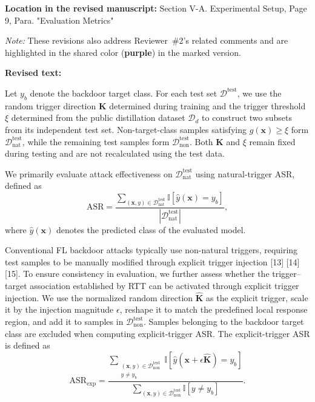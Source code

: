 \documentclass[11pt,a4paper]{article}
\newcommand{\manualindent}{\par\noindent\hspace*{1.5em}\ignorespaces}
\newcommand{\revisedtext}[2]{%
  {\bfseries\color{headingnavy}Location in the revised manuscript:} #1\par
  \begin{tcolorbox}[
      enhanced,breakable,colback=replyblue!3,colframe=replyblue!18,
      before upper={\setlength{\parskip}{6pt}},
      borderline west={2.5pt}{0pt}{replyblue},
      boxrule=0.5pt,arc=1mm,left=11pt,right=9pt,top=8pt,bottom=8pt]
    {\bfseries\color{headingnavy}Revised text:}\par
    #2
  \end{tcolorbox}
  \vspace{0.35em}%
}
\begin{document}
\revisedtext{Section V-A. Experimental Setup, Page 9, Para. "Evaluation Metrics"\par
\noindent \textit{Note:} These revisions also address Reviewer~\#2's related comments and are highlighted in the shared color (\textcolor{share}{\textbf{purple}}) in the marked version.}
{\manualindent Let $y_b$ denote the backdoor target class.
For each test set $\mathcal{D}^{\mathrm{test}}$, we use the random trigger direction $\mathbf{K}$ determined during training and the trigger threshold $\xi$ determined from the public distillation dataset $\mathcal{D}_d$ to construct two subsets from its independent test set.
Non-target-class samples satisfying $g(\mathbf{x}) \geq \xi$ form $\mathcal{D}_{\mathrm{nat}}^{\mathrm{test}}$, while the remaining test samples form $\mathcal{D}_{\mathrm{non}}^{\mathrm{test}}$.
Both $\mathbf{K}$ and $\xi$ remain fixed during testing and are not recalculated using the test data.

We primarily evaluate attack effectiveness on $\mathcal{D}_{\mathrm{nat}}^{\mathrm{test}}$ using natural-trigger ASR, defined as
\begin{equation}
\mathrm{ASR}
=
\frac{
\sum_{(\mathbf{x},y)\in\mathcal{D}_{\mathrm{nat}}^{\mathrm{test}}}
\mathbb{I}[\hat{y}(\mathbf{x})=y_b]
}{
|\mathcal{D}_{\mathrm{nat}}^{\mathrm{test}}|
},
\tag{19}
\end{equation}
where $\hat{y}(\mathbf{x})$ denotes the predicted class of the evaluated model.

\manualindent Conventional FL backdoor attacks typically use non-natural triggers, requiring test samples to be manually modified through explicit trigger injection [13] [14] [15].
To ensure consistency in evaluation, we further assess whether the trigger--target association established by RTT can be activated through explicit trigger injection.
We use the normalized random direction $\hat{\mathbf{K}}$ as the explicit trigger, scale it by the injection magnitude $\epsilon$, reshape it to match the predefined local response region, and add it to samples in $\mathcal{D}_{\mathrm{non}}^{\mathrm{test}}$.
Samples belonging to the backdoor target class are excluded when computing explicit-trigger ASR. The explicit-trigger ASR is defined as
\begin{equation}
\mathrm{ASR}_{\mathrm{exp}}
=
\frac{
\sum_{\substack{
(\mathbf{x},y)\in\mathcal{D}_{\mathrm{non}}^{\mathrm{test}}\\
y\neq y_b
}}
\mathbb{I}[
\hat{y}(\mathbf{x}+\epsilon\hat{\mathbf{K}})=y_b
]
}{
\sum_{(\mathbf{x},y)\in\mathcal{D}_{\mathrm{non}}^{\mathrm{test}}}
\mathbb{I}[y\neq y_b]
}.
\tag{20}
\end{equation}

}
\end{document}
